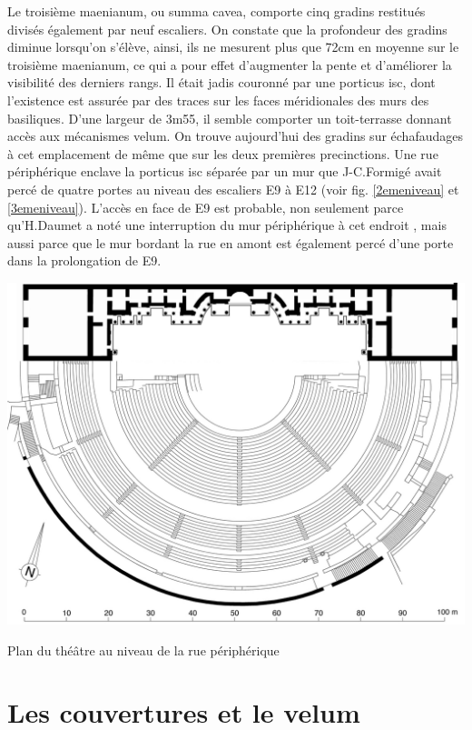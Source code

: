 		Le troisième \gls{maenianum}, ou \gls{summa cavea}, comporte cinq gradins restitués divisés également par neuf escaliers. On constate que la profondeur des gradins diminue lorsqu'on s'élève, ainsi, ils ne mesurent plus que 72cm en moyenne sur le troisième \gls{maenianum}, ce qui a pour effet d'augmenter la pente et d'améliorer la visibilité des derniers rangs. Il était jadis couronné par une \gls{porticus isc}, dont l'existence est assurée par des traces sur les faces méridionales des murs des \glspl{basilique}. D'une largeur de 3m55, il semble comporter un toit-terrasse donnant accès aux mécanismes \gls{velum}. On trouve aujourd'hui des gradins sur échafaudages à cet emplacement de même que sur les deux premières \glspl{precinction}. Une rue périphérique enclave la \gls{porticus isc} séparée par un mur que J-C.Formigé avait percé de quatre portes au niveau des escaliers E9 à E12 (voir fig. \ref{2emeniveau} et \ref{3emeniveau}). L'accès en face de E9 est probable, non seulement parce qu'H.Daumet a noté une interruption du mur périphérique à cet endroit \cite[Pl. VII]{orangePl}, mais aussi parce que le mur bordant la rue en amont est également percé d'une porte dans la prolongation de E9.


	\begin{figureth}
		\includegraphics[width=\linewidth]{images/3emeniveau}
		\caption[Vue de dessus - 3ème niveau]{Plan du théâtre au niveau de la rue périphérique \footnotemark }
		\label{3emeniveau}
	\end{figureth}	
		
\section{Les couvertures et le \gls{velum}}
		
